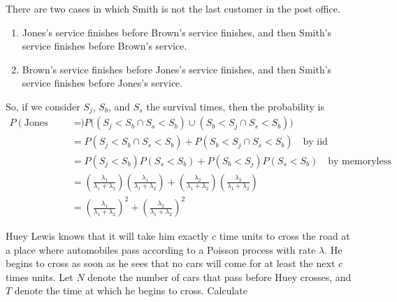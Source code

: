 \documentclass[10pt,a4paper]{exam}
\begin{document}
\begin{questions}
\begin{solution}
There are two cases in which Smith is not the last customer in the post office.
\begin{enumerate}
\item Jones's service finishes before Brown's service finishes, and then Smith's service finishes before Brown's service.
\item Brown's service finishes before Jones's service finishes, and then Smith's service finishes before Jones's service.
\end{enumerate}
So, if we consider $S_j$, $S_b$, and $S_s$ the survival times, then the probability is
\begin{align*}
P(\text{Jones doesn't leave last})			&= P\Big((S_j < S_b \cap  S_s < S_b) \cup (S_b < S_j \cap S_s < S_b)\Big)\\ 
			&= P(S_j < S_b \cap  S_s < S_b) + P(S_b < S_j \cap S_s < S_b) \quad \text{by iid}\\
			&= P(S_j < S_b)P(S_s < S_b) + P(S_b < S_j)P(S_s < S_b) \quad \text{by memoryless}\\
			&= \left(\frac{\lambda_1}{\lambda_1 + \lambda_2}\right)\left(\frac{\lambda_1}{\lambda_1 + \lambda_2}\right)
			+  \left(\frac{\lambda_2}{\lambda_1 + \lambda_2}\right) \left(\frac{\lambda_2}{\lambda_1 + \lambda_2}\right)\\
			&= \left(\frac{\lambda_1}{\lambda_1 + \lambda_2}\right)^2 + \left(\frac{\lambda_2}{\lambda_1 + \lambda_2}\right)^2
\end{align*}
\end{solution}
\pagebreak
\question Huey Lewis knows that it will take him exactly $c$ time units to cross the road at a place where automobiles pass according to a Poisson process with rate $\lambda$. He begins to cross as soon as he sees that no cars will come for at least the next $c$ times units. Let $N$ denote the number of cars that pass before Huey crosses, and $T$ denote the time at which he begins to cross. Calculate
\end{questions}
\end{document}
